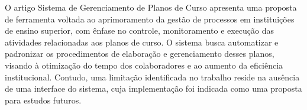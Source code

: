 O artigo Sistema de Gerenciamento de Planos de Curso \cite{oliveirasistema} apresenta uma proposta de ferramenta voltada ao aprimoramento da gestão de processos em instituições de ensino superior, com ênfase no controle, monitoramento e execução das atividades relacionadas aos planos de curso. O sistema busca automatizar e padronizar os procedimentos de elaboração e gerenciamento desses planos, visando à otimização do tempo dos colaboradores e ao aumento da eficiência institucional. Contudo, uma limitação identificada no trabalho reside na ausência de uma interface do sistema, cuja implementação foi indicada como uma proposta para estudos futuros.

